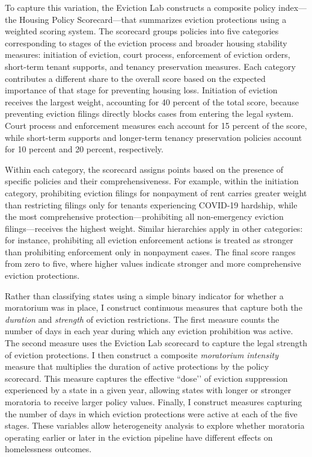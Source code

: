 \documentclass[12pt]{article}
\begin{document}
To capture this variation, the Eviction Lab constructs a composite policy index—the Housing Policy Scorecard—that summarizes eviction protections using a weighted scoring system. The scorecard groups policies into five categories corresponding to stages of the eviction process and broader housing stability measures: initiation of eviction, court process, enforcement of eviction orders, short-term tenant supports, and tenancy preservation measures. Each category contributes a different share to the overall score based on the expected importance of that stage for preventing housing loss. Initiation of eviction receives the largest weight, accounting for 40 percent of the total score, because preventing eviction filings directly blocks cases from entering the legal system. Court process and enforcement measures each account for 15 percent of the score, while short-term supports and longer-term tenancy preservation policies account for 10 percent and 20 percent, respectively.

Within each category, the scorecard assigns points based on the presence of specific policies and their comprehensiveness. For example, within the initiation category, prohibiting eviction filings for nonpayment of rent carries greater weight than restricting filings only for tenants experiencing COVID-19 hardship, while the most comprehensive protection—prohibiting all non-emergency eviction filings—receives the highest weight. Similar hierarchies apply in other categories: for instance, prohibiting all eviction enforcement actions is treated as stronger than prohibiting enforcement only in nonpayment cases. The final score ranges from zero to five, where higher values indicate stronger and more comprehensive eviction protections.

Rather than classifying states using a simple binary indicator for whether a moratorium was in place, I construct continuous measures that capture both the \textit{duration} and \textit{strength} of eviction restrictions. The first measure counts the number of days in each year during which any eviction prohibition was active. The second measure uses the Eviction Lab scorecard to capture the legal strength of eviction protections. I then construct a composite \textit{moratorium intensity} measure that multiplies the duration of active protections by the policy scorecard. This measure captures the effective ``dose’’ of eviction suppression experienced by a state in a given year, allowing states with longer or stronger moratoria to receive larger policy values. Finally, I construct measures capturing the number of days in which eviction protections were active at each of the five stages. These variables allow heterogeneity analysis to explore whether moratoria operating earlier or later in the eviction pipeline have different effects on homelessness outcomes.
\end{document}
